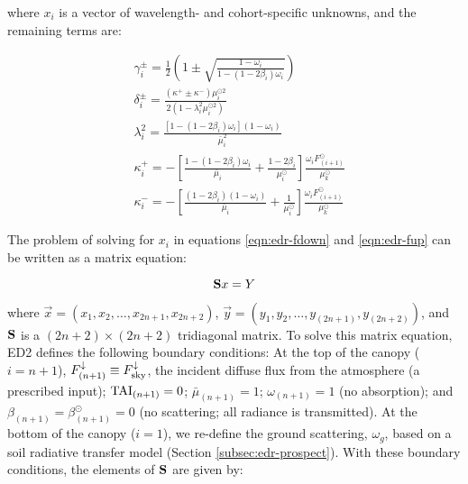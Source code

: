 where $x_{i}$ is a vector of wavelength- and cohort-specific unknowns, and the remaining terms are:

\begin{align}
  & \gamma^{\pm}_{i} = \frac{1}{2} \left( 1 \pm \sqrt{ \frac{1-\omega_{i}}{1-(1-2\beta_{i})\omega_{i}} } \right) \\
  & \delta^{\pm}_{i} = \frac{\left( \kappa^{+} \pm \kappa^{-} \right) \mu^{\odot 2}_{i}}{2\left( 1 - \lambda_{i}^{2} \mu^{\odot 2}_{i}\right)} \\
  & \lambda^{2}_{i} = \frac{\left[ 1-(1-2\beta_{i})\omega_{i} \right]\left(1-\omega_{i}\right)}{\bar{\mu}_{i}^{2}} \\
  & \kappa^{+}_{i} = -\left[\frac{1 - \left(1 - 2\beta_{i}\right)\omega_{i}}{\bar{\mu}_{i}} + \frac{1 - 2\beta_{i}}{\mu^{\odot}_{i}}\right] \frac{\omega_{i}F^{\odot}_{(i+1)}}{\mu^{\odot}_{k}} \\
  & \kappa^{-}_{i} = -\left[\frac{\left(1 - 2\beta_{i}\right)\left(1-\omega_{i}\right)}{\bar{\mu}_{i}} + \frac{1}{\mu^{\odot}_{i}}\right] \frac{\omega_{i}F^{\odot}_{(i+1)}}{\mu^{\odot}_{k}}
\end{align}

The problem of solving for $x_{i}$ in equations \ref{eqn:edr-fdown} and \ref{eqn:edr-fup} can be written as a matrix equation:

\begin{equation}
  \mathbf{S} \relax{x} = \relax{Y}
\end{equation}

where $\vec{x} = \left( x_{1},x_{2}, \ldots, x_{2n+1}, x_{2n+2} \right)$,
$\vec{y} = \left( y_{1}, y_{2}, \ldots, y_{(2n+1)}, y_{(2n+2)} \right)$,
and $\mathbf{S}$ is a $(2n + 2) \times (2n + 2)$ tridiagonal matrix.
To solve this matrix equation, ED2 defines the following boundary conditions:
At the top of the canopy ($i=n+1$),
$F^{\downarrow}_{(n+1)} \equiv F^{\downarrow}_{\mathrm{sky}}$, the incident diffuse flux from the atmosphere (a prescribed input);
$\mathrm{TAI}_{(n+1)} = 0$;
$\bar{\mu}_{(n+1)} = 1$;
$\omega_{(n+1)} = 1$ (no absorption);
and
$\beta_{(n+1)} = \beta^{\odot}_{(n+1)} = 0$ (no scattering; all radiance is transmitted).
At the bottom of the canopy ($i=1$), we re-define the ground scattering, $\omega_{g}$, based on a soil radiative transfer model (Section \ref{subsec:edr-prospect}).
With these boundary conditions, the elements of $\mathbf{S}$ are given by:

